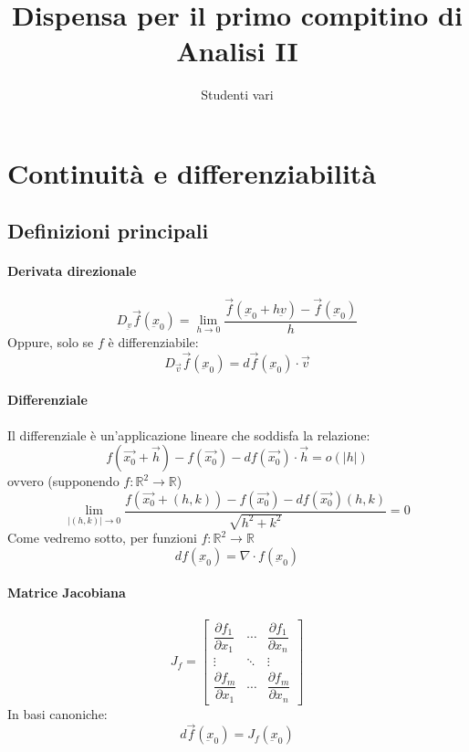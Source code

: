 \documentclass[a4paper,12pt]{article}
\begin{document}
\begin{titlepage}
\title{Dispensa per il primo compitino di Analisi II}
\author{Studenti vari}
\maketitle
\end{titlepage}

\begin{titlepage}
\tableofcontents
\end{titlepage}




\section{Continuità e differenziabilità}
\subsection{Definizioni principali}
\paragraph{Derivata direzionale}
$$D_{\underbar{v}} \vec{f}(\underbar{x}_0) = \lim_{h \to 0}{\dfrac{\vec{f}(\underbar{x}_0+h\underbar{v})-\vec{f}(\underbar{x}_0)}{h}}$$
Oppure, solo se $f$ è differenziabile:
$$D_{\vec{v}} \vec{f}(\underbar{x}_0) = d\vec{f}(\underbar{x}_0)\cdot\vec{v}$$

\paragraph{Differenziale}
Il differenziale è un'applicazione lineare che soddisfa la relazione:
$$f(\vec{x_0}+\vec{h}) - f(\vec{x_0}) - df(\vec{x_0})\cdot\vec{h} = o(|h|)$$
ovvero (supponendo $f:\mathbb{R}^2\rightarrow\mathbb{R}$)
$$ \lim_{|(h, k)| \to 0} \dfrac{f(\vec{x_0}+(h, k)) - f(\vec{x_0}) - df(\vec{x_0})(h, k)}{\sqrt{h^2+k^2}} = 0 $$
Come vedremo sotto, per funzioni $f: \mathbb{R}^2 \rightarrow \mathbb{R}$
$$df(\underbar{x}_0) = \nabla \cdot f(\underbar{x}_0)$$
\paragraph{Matrice Jacobiana}
$$J_f = \begin{bmatrix} \dfrac{\partial f_1}{\partial x_1} & \cdots & \dfrac{\partial f_1}{\partial x_n} \\ \vdots & \ddots & \vdots \\ \dfrac{\partial f_m}{\partial x_1} & \cdots & \dfrac{\partial f_m}{\partial x_n}  \end{bmatrix}$$
In basi canoniche:
$$ d\vec{f}(\underbar{x}_0)= J_f(\underbar{x}_0) $$
\end{document}
